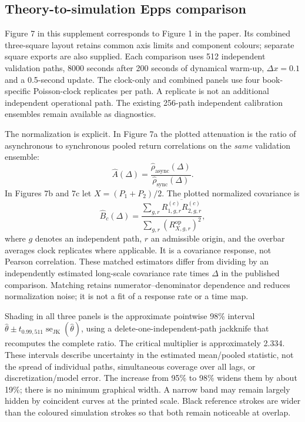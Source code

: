 \documentclass[11pt]{article}
\begin{document}


\subsection{Theory-to-simulation Epps comparison}

Figure 7 in this supplement corresponds to Figure 1 in the paper. Its combined three-square layout retains common axis limits and component colours; separate square exports are also supplied. Each comparison uses 512 independent validation paths, 8000 seconds after 200 seconds of dynamical warm-up, $\Delta x=0.1$ and a 0.5-second update. The clock-only and combined panels use four book-specific Poisson-clock replicates per path. A replicate is not an additional independent operational path. The existing 256-path independent calibration ensembles remain available as diagnostics.

The normalization is explicit. In Figure 7a the plotted attenuation is the ratio of asynchronous to synchronous pooled return correlations on the \emph{same} validation ensemble:
\begin{equation}
\widehat A(\Delta)=\frac{\widehat\rho_{\mathrm{async}}(\Delta)}
{\widehat\rho_{\mathrm{sync}}(\Delta)}.
\label{eq:matched-clock}
\end{equation}
In Figures 7b and 7c let $X=(P_1+P_2)/2$. The plotted normalized covariance is
\begin{equation}
\widehat B_c(\Delta)=
\frac{\sum_{g,r}\overline{R^{(c)}_{1,g,r}R^{(c)}_{2,g,r}}}
{\sum_{g,r}(R^{\mathrm{op}}_{X,g,r})^2},
\label{eq:matched-covariance}
\end{equation}
where $g$ denotes an independent path, $r$ an admissible origin, and the overbar averages clock replicates where applicable. It is a covariance response, not Pearson correlation. These matched estimators differ from dividing by an independently estimated long-scale covariance rate times $\Delta$ in the published comparison. Matching retains numerator--denominator dependence and reduces normalization noise; it is not a fit of a response rate or a time map.

Shading in all three panels is the approximate pointwise 98\% interval
$\widehat\theta\pm t_{0.99,511}\operatorname{se}_{\mathrm{JK}}(\widehat\theta)$,
using a delete-one-independent-path jackknife that recomputes the complete ratio. The critical multiplier is approximately 2.334. These intervals describe uncertainty in the estimated mean/pooled statistic, not the spread of individual paths, simultaneous coverage over all lags, or discretization/model error. The increase from 95\% to 98\% widens them by about 19\%; there is no minimum graphical width. A narrow band may remain largely hidden by coincident curves at the printed scale. Black reference strokes are wider than the coloured simulation strokes so that both remain noticeable at overlap.
\end{document}
